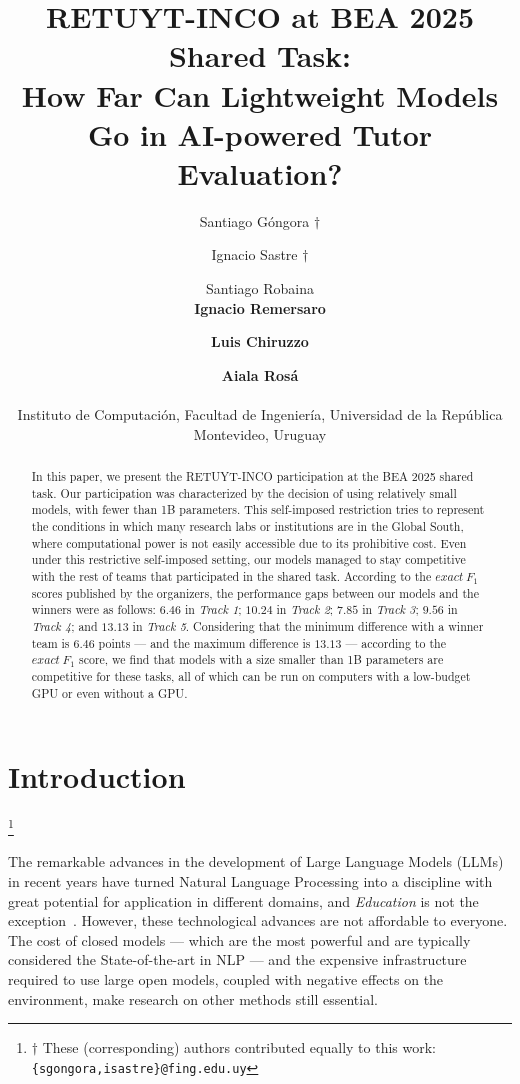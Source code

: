 \documentclass[11pt]{article}
\title{RETUYT-INCO at BEA 2025 Shared Task:\\ How Far Can Lightweight Models Go in AI-powered Tutor Evaluation?}
\author{Santiago Góngora $\dagger$ \and Ignacio Sastre $\dagger$ \and Santiago Robaina \\ {\bf Ignacio Remersaro} \and {\bf Luis Chiruzzo} \and {\bf Aiala Rosá}\\\\
Instituto de Computación, Facultad de Ingeniería, Universidad de la República \\ Montevideo, Uruguay}
\newcommand\blfootnote[1]{
    \begingroup
    \renewcommand\thefootnote{}\footnote{#1}
    \addtocounter{footnote}{-1}
    \endgroup
}
\begin{document}
\maketitle
\begin{abstract}
In this paper, we present the RETUYT-INCO participation at the BEA 2025 shared task.
Our participation was characterized by the decision of using relatively small models, with fewer than 1B parameters.
This self-imposed restriction tries to represent the conditions in which many research labs or institutions are in the Global South, where computational power is not easily accessible due to its prohibitive cost.
Even under this restrictive self-imposed setting, our models managed to stay competitive with the rest of teams that participated in the shared task.
According to the $exact\ F_1$ scores published by the organizers, the performance gaps between our models and the winners were as follows: $6.46$ in \textit{Track 1}; $10.24$ in \textit{Track 2}; $7.85$ in \textit{Track 3}; $9.56$ in \textit{Track 4}; and $13.13$ in \textit{Track 5}.
Considering that the minimum difference with a winner team is $6.46$ points --- and the maximum difference is $13.13$ --- according to the $exact\ F_1$ score, we find that models with a size smaller than 1B parameters are competitive for these tasks, all of which can be run on computers with a low-budget GPU or even without a GPU.
\end{abstract}

\section{Introduction}
\label{sec:introduction}

\blfootnote{$\dagger$ These (corresponding) authors contributed equally to this work: \texttt{\{sgongora,isastre\}@fing.edu.uy}}



The remarkable advances in the development of Large Language Models (LLMs) in recent years have turned Natural Language Processing into a discipline with great potential for application in different domains, and \textit{Education} is not the exception~\citep{ignat-etal-2024-solved}. 
However, these technological advances are not affordable to everyone. 
The cost of closed models --- which are the most powerful and are typically considered the State-of-the-art in NLP --- and the expensive infrastructure required to use large open models, coupled with negative effects on the environment, make research on other methods still essential.
\end{document}
